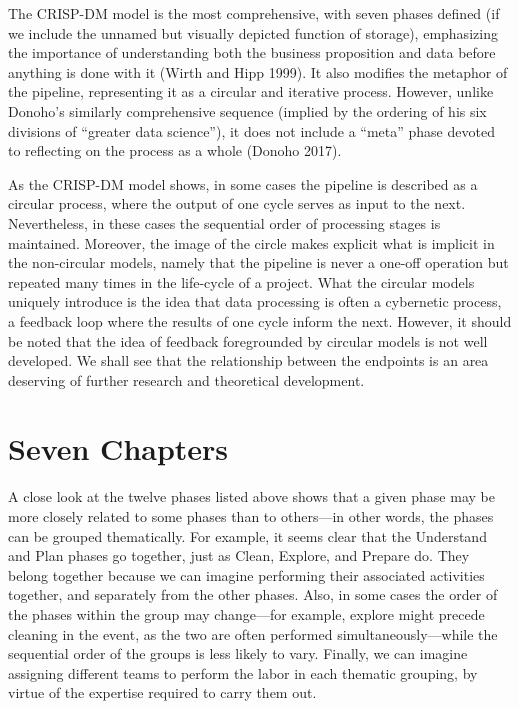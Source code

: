 \documentclass[
  letterpaper,
]{report}
\begin{document}
The CRISP-DM model is the most comprehensive, with seven phases defined
(if we include the unnamed but visually depicted function of storage),
emphasizing the importance of understanding both the business
proposition and data before anything is done with it (Wirth and Hipp
1999). It also modifies the metaphor of the pipeline, representing it as
a circular and iterative process. However, unlike Donoho's similarly
comprehensive sequence (implied by the ordering of his six divisions of
``greater data science''), it does not include a ``meta'' phase devoted
to reflecting on the process as a whole (Donoho 2017).

As the CRISP-DM model shows, in some cases the pipeline is described as
a circular process, where the output of one cycle serves as input to the
next. Nevertheless, in these cases the sequential order of processing
stages is maintained. Moreover, the image of the circle makes explicit
what is implicit in the non-circular models, namely that the pipeline is
never a one-off operation but repeated many times in the life-cycle of a
project. What the circular models uniquely introduce is the idea that
data processing is often a cybernetic process, a feedback loop where the
results of one cycle inform the next. However, it should be noted that
the idea of feedback foregrounded by circular models is not well
developed. We shall see that the relationship between the endpoints is
an area deserving of further research and theoretical development.

\hypertarget{seven-chapters}{%
\chapter{Seven Chapters}\label{seven-chapters}}

A close look at the twelve phases listed above shows that a given phase
may be more closely related to some phases than to others---in other
words, the phases can be grouped thematically. For example, it seems
clear that the Understand and Plan phases go together, just as Clean,
Explore, and Prepare do. They belong together because we can imagine
performing their associated activities together, and separately from the
other phases. Also, in some cases the order of the phases within the
group may change---for example, explore might precede cleaning in the
event, as the two are often performed simultaneously---while the
sequential order of the groups is less likely to vary. Finally, we can
imagine assigning different teams to perform the labor in each thematic
grouping, by virtue of the expertise required to carry them out.
\end{document}
